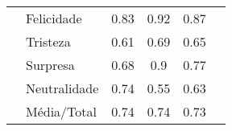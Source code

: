\begin{table}[]
\begin{tabular}{llcccc}
                                         & Felicidade            & 0.83                                  & 0.92                                   & 0.87                                  &                                       \\
                                         & Tristeza              & 0.61                                  & 0.69                                   & 0.65                                  &                                       \\
                                         & Surpresa              & 0.68                                  & 0.9                                    & 0.77                                  &                                       \\
                                         & Neutralidade          & 0.74                                  & 0.55                                   & 0.63                                  &                                       \\
                                         & Média/Total           & 0.74                                  & 0.74                                   & 0.73                                  &                                       \\ \hline
\end{tabular}
\end{table}

